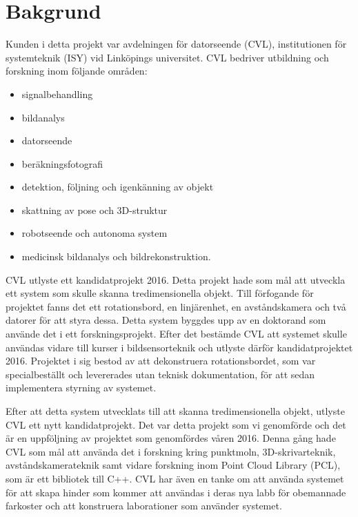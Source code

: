\chapter{Bakgrund}
\label{cha:background}


Kunden i detta projekt var avdelningen för datorseende (CVL), institutionen för systemteknik (ISY) vid Linköpings universitet. CVL bedriver utbildning och forskning inom följande områden:
\begin{itemize}
	\item signalbehandling
	\item bildanalys
	\item datorseende
	\item beräkningsfotografi
	\item detektion, följning och igenkänning av objekt
	\item skattning av pose och 3D-struktur
	\item robotseende och autonoma system
	\item medicinsk bildanalys och bildrekonstruktion.
\end{itemize}

CVL utlyste ett kandidatprojekt 2016. Detta projekt hade som mål att utveckla ett system som skulle skanna tredimensionella objekt. Till förfogande för projektet fanns det ett rotationsbord, en linjärenhet, en avståndskamera och två datorer för att styra dessa. Detta system byggdes upp av en doktorand som använde det i ett forskningsprojekt. Efter det bestämde CVL att systemet skulle användas vidare till kurser i bildsensorteknik och utlyste därför kandidatprojektet 2016. Projektet i sig bestod av att dekonstruera rotationsbordet, som var specialbeställt och levererades utan teknisk dokumentation, för att sedan implementera styrning av systemet.

Efter att detta system utvecklats till att skanna tredimensionella objekt, utlyste CVL ett nytt kandidatprojekt. Det var detta projekt som vi genomförde och det är en uppföljning av projektet som genomfördes våren 2016. Denna gång hade CVL som mål att använda det i forskning kring punktmoln, 3D-skrivarteknik, avståndskamerateknik samt vidare forskning inom Point Cloud Library (PCL), som är ett bibliotek till C++. CVL har även en tanke om att använda systemet för att skapa hinder som kommer att användas i deras nya labb för obemannade farkoster och att konstruera laborationer som använder systemet. 

